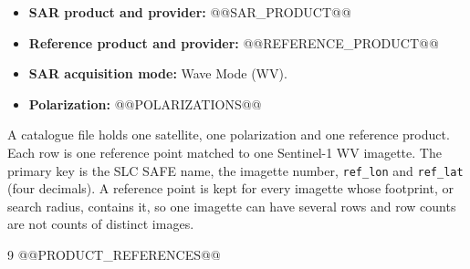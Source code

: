 \documentclass[11pt,a4paper]{article}
\begin{document}
\begin{itemize}
    \item \textbf{SAR product and provider:} @@SAR_PRODUCT@@
    \item \textbf{Reference product and provider:} @@REFERENCE_PRODUCT@@
    \item \textbf{SAR acquisition mode:} Wave Mode (WV).
    \item \textbf{Polarization:} @@POLARIZATIONS@@
\end{itemize}

\noindent
A catalogue file holds one satellite, one polarization and one reference product. Each row is
one reference point matched to one Sentinel-1 WV imagette. The primary key is the SLC SAFE name,
the imagette number, \texttt{ref\_lon} and \texttt{ref\_lat} (four decimals). A reference point
is kept for every imagette whose footprint, or search radius, contains it, so one imagette can
have several rows and row counts are not counts of distinct images.

\newpage
{}

\begin{thebibliography}{9}
@@PRODUCT_REFERENCES@@
\end{thebibliography}
\end{document}
